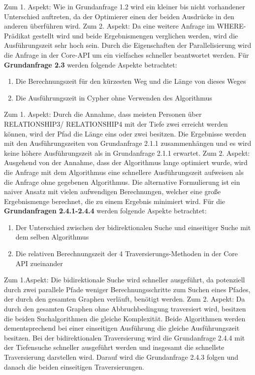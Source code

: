 Zum 1. Aspekt: Wie in Grundanfrage 1.2 wird ein kleiner bis nicht vorhandener Unterschied auftreten, da der Optimierer einen der beiden Ausdrücke in den anderen überführen wird. \newline
Zum 2. Aspekt: Da eine weitere Anfrage im WHERE-Prädikat gestellt wird und beide Ergebnismengen verglichen werden, wird die Ausführungszeit sehr hoch sein. Durch die Eigenschaften der Parallelisierung wird die Anfrage in der Core-API um ein vielfaches schneller beantwortet werden. \newline  \newline
Für \textbf{Grundanfrage 2.3} werden folgende Aspekte betrachtet: 
\begin{enumerate}
	\item Die Berechnungszeit für den kürzesten Weg und die Länge von dieses Weges
	\item Die Ausführungszeit in Cypher ohne Verwenden des Algorithmus
\end{enumerate}
Zum 1. Aspekt: Durch die Annahme, dass meisten Personen über RELATIONSHIP3/ RELATIONSHIP4 mit der Tiefe zwei erreicht werden können, wird  der Pfad die Länge eins oder zwei besitzen. Die Ergebnisse werden mit den Ausführungszeiten von Grundanfrage 2.1.1 zusammenhängen und es wird keine höhere Ausführungszeit als in Grundanfrage 2.1.1 erwartet. \newline
Zum 2. Aspekt: Ausgehend von der Annahme, dass der Algorithmus lange optimiert wurde, wird die Anfrage mit dem Algorithmus eine schnellere Ausführungszeit aufweisen als die Anfrage ohne gegebenen Algorithmus. Die alternative Formulierung ist ein naiver Ansatz mit vielen aufwendigen Berechnungen, welcher eine große Ergebnismenge berechnet, die zu einem Ergebnis minimiert wird. \newline \newline \bigskip
Für die \textbf{Grundanfragen 2.4.1-2.4.4} werden folgende Aspekte betrachtet:
\begin{enumerate}
	\item Der Unterschied zwischen der bidirektionalen Suche und einseitiger Suche mit dem selben Algorithmus
	\item Die relativen Berechnungszeit der 4 Traversierungs-Methoden in der Core API zueinander
\end{enumerate}
Zum 1.Aspekt: Die bidirektionale Suche wird schneller ausgeführt, da potenziell durch zwei parallele Pfade  weniger Berechnungsschritte zum Suchen eines Pfades, der  durch den gesamten Graphen verläuft, benötigt werden. \newline 
Zum 2. Aspekt: Da durch den gesamten Graphen ohne Abbruchbedingung traversiert wird, besitzen die beiden Suchalgorithmen die gleiche Komplexität. Beide Algorithmen werden dementsprechend bei einer einseitigen Ausführung die gleiche Ausführungszeit besitzen. Bei der bidirektionalen Traversierung wird die Grundanfrage 2.4.4 mit der Tiefensuche schneller ausgeführt werden und insgesamt die schnellste Traversierung darstellen wird. Darauf wird die Grundanfrage 2.4.3 folgen und danach die beiden einseitigen Traversierungen. 
